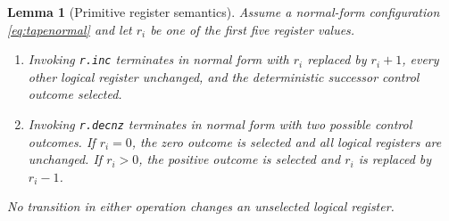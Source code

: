 \documentclass[10pt]{article}
\newtheorem{lemma}[theorem]{Lemma}
\theoremstyle{definition}
\begin{document}
\begin{lemma}[Primitive register semantics]
\label{lem:backendprimitive}
Assume a normal-form configuration \eqref{eq:tapenormal} and let $r_i$ be one
of the first five register values.
\begin{enumerate}[label=(\roman*)]
\item Invoking \texttt{r.inc} terminates in normal form with
$r_i$ replaced by $r_i+1$, every other logical register unchanged, and the
deterministic successor control outcome selected.
\item Invoking \texttt{r.decnz} terminates in normal form with two possible
control outcomes.  If $r_i=0$, the zero outcome is selected and all logical
registers are unchanged.  If $r_i>0$, the positive outcome is selected and
$r_i$ is replaced by $r_i-1$.
\end{enumerate}
No transition in either operation changes an unselected logical register.
\end{lemma}
\end{document}
